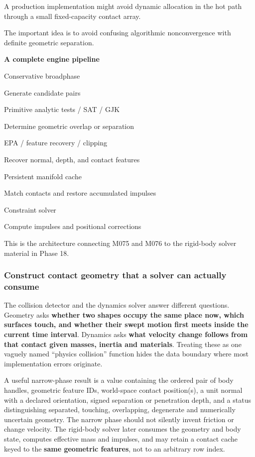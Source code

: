 A production implementation might avoid dynamic allocation in the hot path through a small fixed-capacity contact array.

The important idea is to avoid confusing algorithmic nonconvergence with definite geometric separation.

\textbf{A complete engine pipeline}

Conservative broadphase

Generate candidate pairs

Primitive analytic tests / SAT / GJK

Determine geometric overlap or separation

EPA / feature recovery / clipping

Recover normal, depth, and contact features

Persistent manifold cache

Match contacts and restore accumulated impulses

Constraint solver

Compute impulses and positional corrections

This is the architecture connecting M075 and M076 to the rigid-body solver material in Phase 18.

\subsubsection{Construct contact geometry that a solver can actually consume}\label{04-visual-computing-ii-ch026-construct-contact-geometry-that-a-solver-can-actually-consume}

\hypertarget{04-visual-computing-ii-ch026-construct-contact-geometry-that-a-solver-can-actually-consume}{}

The collision detector and the dynamics solver answer different questions. Geometry asks \textbf{whether two shapes occupy the same place now, which surfaces touch, and whether their swept motion first meets inside the current time interval}. Dynamics asks \textbf{what velocity change follows from that contact given masses, inertia and materials}. Treating these as one vaguely named ``physics collision'' function hides the data boundary where most implementation errors originate.

A useful narrow-phase result is a value containing the ordered pair of body handles, geometric feature IDs, world-space contact position(s), a unit normal with a declared orientation, signed separation or penetration depth, and a status distinguishing separated, touching, overlapping, degenerate and numerically uncertain geometry. The narrow phase should not silently invent friction or change velocity. The rigid-body solver later consumes the geometry and body state, computes effective mass and impulses, and may retain a contact cache keyed to the \textbf{same geometric features}, not to an arbitrary row index.

